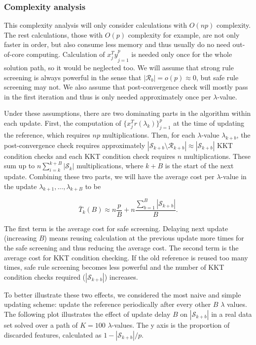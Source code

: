 \subsubsection{Complexity analysis}

This complexity analysis will only consider calculations with $O(np)$ complexity. The rest calculations, those with $O(p)$ complexity for example, are not only faster in order, but also consume less memory and thus usually do no need out-of-core computing. Calculation of ${x_j^Ty}_{j=1}^p$ is needed only once for the whole solution path, so it would be neglected too. We will assume that strong rule screening is always powerful in the sense that $|\mathcal{R}_b|=o(p)\approx0$, but safe rule screening may not. We also assume that post-convergence check will mostly pass in the first iteration and thus is only needed approximately once per $\lambda$-value.

Under these assumptions, there are two dominating parts in the algorithm within each update. First, the computation of $\{x_j^Tr(\lambda_k)\}_{j=1}^p$ at the time of updating the reference, which requires $np$ multiplications. Then, for each $\lambda$-value $\lambda_{k+b}$, the post-convergence check requires approximately $|\mathcal{S}_{k+b}\setminus\mathcal{R}_{k+b}|\approx|\mathcal{S}_{k+b}|$ KKT condition checks and each KKT condition check requires $n$ multiplications. These sum up to $n\sum_{i=k}^{k+B}|\mathcal{S}_k|$ multiplications, where $k+B$ is the start of the next update. Combining these two parts, we will have the average cost per $\lambda$-value in the update $\lambda_{k+1},...,\lambda_{k+B}$ to be

\begin{equation}
    \bar{T}_k(B) \approx n\frac{p}{B}+n\frac{\sum_{b=1}^B|\mathcal{S}_{k+b}|}{B}.
\end{equation}

The first term is the average cost for safe screening. Delaying next update (increasing $B$) means reusing calculation at the previous update more times for the safe screening and thus reducing the average cost. The second term is the average cost for KKT condition checking. If the old reference is reused too many times, safe rule screening becomes less powerful and the number of KKT condition checks required ($|\mathcal{S}_{k+b}|$) increases.

To better illustrate these two effects, we considered the most naive and simple updating scheme: update the reference periodically after every other $B$ $\lambda$ values. The following plot illustrates the effect of update delay $B$ on $|\mathcal{S}_{k+b}|$ in a real data set solved over a path of $K=100$ $\lambda$-values. The y axis is the proportion of discarded features, calculated as $1-|\mathcal{S}_{k+b}|/p$.

